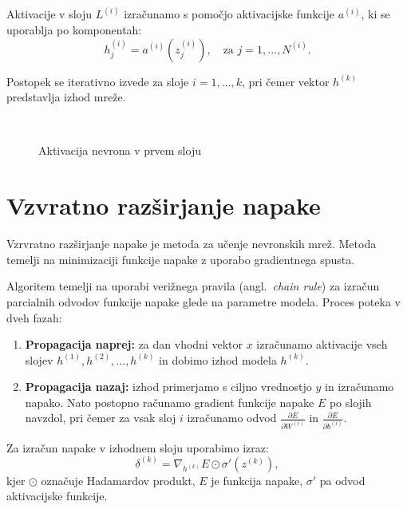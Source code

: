 Aktivacije v sloju $L^{(i)}$ izračunamo s pomočjo aktivacijske funkcije $a^{(i)}$, ki se uporablja po komponentah:
  \[
    h^{(i)}_j = a^{(i)}\left(z^{(i)}_j\right), \quad \text{za } j = 1, \dots, N^{(i)}.
  \]

Postopek se iterativno izvede za sloje $i = 1, \dots, k$, pri čemer vektor $h^{(k)}$ predstavlja izhod mreže.

\begin{figure}[H]
  \centering
  
  \caption{Aktivacija nevrona v prvem sloju}~\label{fig:nn-activation}
\end{figure}


\section{Vzvratno razširjanje napake}

Vzrvratno razširjanje napake je metoda za učenje nevronskih mrež. Metoda temelji na minimizaciji funkcije napake z uporabo gradientnega spusta. 

Algoritem temelji na uporabi verižnega pravila (angl.\ \textit{chain rule}) za izračun parcialnih odvodov funkcije napake glede na parametre modela. Proces poteka v dveh fazah:
\begin{enumerate}
  \item \textbf{Propagacija naprej:} za dan vhodni vektor $x$ izračunamo aktivacije vseh slojev $h^{(1)}, h^{(2)}, \dots, h^{(k)}$ in dobimo izhod modela $h^{(k)}$.
  \item \textbf{Propagacija nazaj:} izhod primerjamo s ciljno vrednostjo $y$ in izračunamo napako. Nato postopno računamo gradient funkcije napake $E$ po slojih navzdol, pri čemer za vsak sloj $i$ izračunamo odvod $\frac{\partial E}{\partial W^{(i)}}$ in $\frac{\partial E}{\partial b^{(i)}}$.
\end{enumerate}

Za izračun napake v izhodnem sloju uporabimo izraz:
\[
\delta^{(k)} = \nabla_{h^{(k)}} E \odot \sigma' \left(z^{(k)} \right),
\]
kjer $\odot$ označuje Hadamardov produkt, $E$ je funkcija napake, $\sigma'$ pa odvod aktivacijske funkcije.

